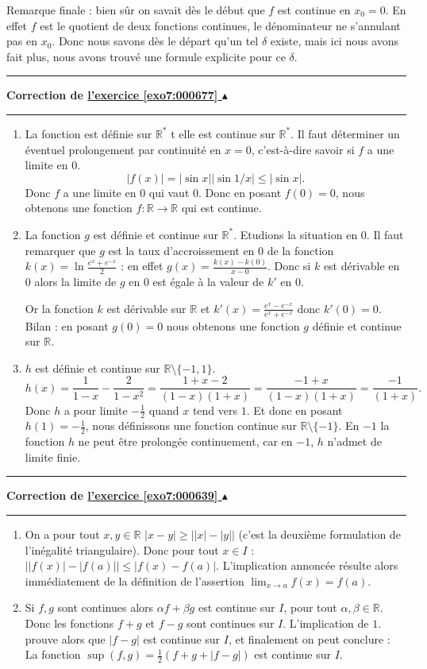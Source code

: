 \documentclass[11pt,a4paper]{article}
\newcommand{\Rr}{\mathbb{R}} \newcommand{\R}{\mathbb{R}}
\newcounter{exo}
\newcommand{\correction}[1]{\hypertarget{cor7:#1}{}\label{cor7:#1}{\bf Correction de \hyperlink{exo7:#1}{l'exercice \ref{exo7:#1} $\blacktriangle$}}\vspace{1mm}\hrule\vspace{1mm}}
\newcommand{\fincorrection}{\vspace{1mm}\hrule\vspace*{7mm}}
\begin{document}
\bigskip

Remarque finale :
bien sûr on savait dès le début que $f$ est continue en $x_0=0$. En effet
$f$ est le quotient de deux fonctions continues, le dénominateur ne s'annulant
pas en $x_0$. Donc nous savons dès le départ qu'un tel $\delta$ existe,
mais ici nous avons fait plus, nous avons trouvé une formule explicite pour ce $\delta$.

\fincorrection
\correction{000677}
\begin{enumerate}
  \item La fonction est d\'efinie sur $\Rr^*$ t elle est continue sur $\Rr^*$. Il faut d\'eterminer un \'eventuel prolongement par continuit\'e en $x=0$, c'est-\`a-dire savoir si $f$ a une limite en $0$.
$$|f(x)| = |\sin x| |\sin 1/x| \leq |\sin x|.$$
Donc $f$ a une limite en $0$ qui vaut $0$. 
Donc en posant $f(0) = 0$, nous obtenons une fonction $f : \Rr \longrightarrow \Rr$ qui est continue.
  \item La fonction $g$ est d\'efinie et continue sur $\Rr^*$. 
Etudions la situation en $0$. Il faut remarquer que $g$ est la taux d'accroissement en
$0$ de la fonction $k(x) = \ln \frac{e^x+e^{-x}}{2}$ : en effet $g(x)=\frac{k(x)-k(0)}{x-0}$.
Donc si $k$ est dérivable en $0$ alors la limite de $g$ en $0$ est \'egale \`a
la valeur de $k'$ en $0$. 

Or la fonction $k$ est dérivable sur $\Rr$ et $k'(x) = \frac{e^x-e^{-x}}{e^x+e^{-x}}$
donc $k'(0)=0$. Bilan : en posant $g(0)=0$ nous obtenons une fonction $g$ d\'efinie et continue sur $\Rr$.

  \item $h$ est d\'efinie et continue sur $\Rr \setminus \{ -1,1 \}$.
$$h(x) = \frac{1}{1-x} - \frac{2}{1-x^2} = \frac{1+x-2}{(1-x)(1+x)}
= \frac{-1+x}{(1-x)(1+x)} = \frac{-1}{(1+x)}.$$
Donc $h$ a pour limite $-\frac 12$ quand $x$ tend vers $1$.
Et donc en posant $h(1) = -\frac 12$, nous d\'efinissons une fonction
continue sur $\Rr \setminus \{ -1 \}$.
En $-1$ la fonction $h$ ne peut \^etre prolong\'ee continuement,
car en $-1$, $h$ n'admet de limite finie.
\end{enumerate}
\fincorrection
\correction{000639}
\begin{enumerate}
    \item On a pour tout $x,y\in\R$ $|x-y|\geq \big| |x|-|y|\big|$
(c'est la deuxi\`eme formulation de l'in\'egalit\'e triangulaire).
Donc pour tout $x\in I$ :$ \big| |f(x)|-|f(a)| \big| \leq |f(x)-f(a)| $.
L'implication annonc\'ee r\'esulte alors imm\'ediatement de la
d\'efinition de l'assertion $\lim_{x\to a} f(x)=f(a). $
    \item  Si $f,g$ sont continues
alors $\alpha f+\beta g$ est continue sur $I$, pour tout
$\alpha,\beta\in\R$. Donc les fonctions $f+g$ et $f-g$ sont
continues sur $I$. L'implication de $1.$ prouve alors que $|f-g|$
est continue sur $I$, et finalement on peut
conclure :\\
La fonction $\sup (f,g) = \frac{1}{2}(f+g+|f-g|)$ est continue sur
$I$.
\end{enumerate}
\end{document}
